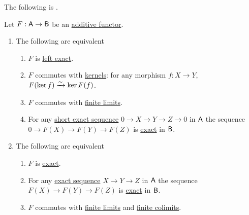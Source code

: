 \documentclass[../../../main]{subfiles}
\begin{document}
The following is \cite[Lemma 5.2.2]{schapiraIntroductionCategoriesSheaves}.
\begin{lemma} \label{lemma:schapira-exact-functor}
  Let \(F: \mathsf{A} \to \mathsf{B}\) be an \hyperref[def:additive-functor]{additive functor}.
  \begin{enumerate}
    \item The following are equivalent
          \begin{enumerate}
            \item \(F\) is \hyperref[def:exact-functor]{left exact}.
            \item \(F\) commutes with \hyperref[def:categorical-kernel]{kernels}: for any morphism \(f: X \to Y\), \(F(\ker f) \xrightarrow{\sim} \ker F(f)\).
            \item \(F\) commutes with \hyperref[def:categorical-limit]{finite limits}.
            \item For any \hyperref[def:short-exact-sequence]{short exact sequence} \(0 \to X \to Y \to Z \to 0\) in \(\mathsf{A}\) the sequence \(0 \to F(X) \to F(Y) \to F(Z)\) is \hyperref[def:short-exact-sequence]{exact} in \(\mathsf{B}\).
          \end{enumerate}

    \item  The following are equivalent
          \begin{enumerate}
            \item \(F\) is \hyperref[def:exact-functor]{exact}.
            \item For any \hyperref[def:exact-complex]{exact sequence} \(X \to Y \to Z\) in \(\mathsf{A}\) the sequence \(F(X) \to F(Y) \to F(Z)\) is \hyperref[def:exact-complex]{exact} in \(\mathsf{B}\).
            \item \(F\) commutes with \hyperref[def:categorical-colimit]{finite limits} and \hyperref[def:categorical-colimit]{finite colimits}.
          \end{enumerate}
  \end{enumerate}
\end{lemma}
\end{document}
